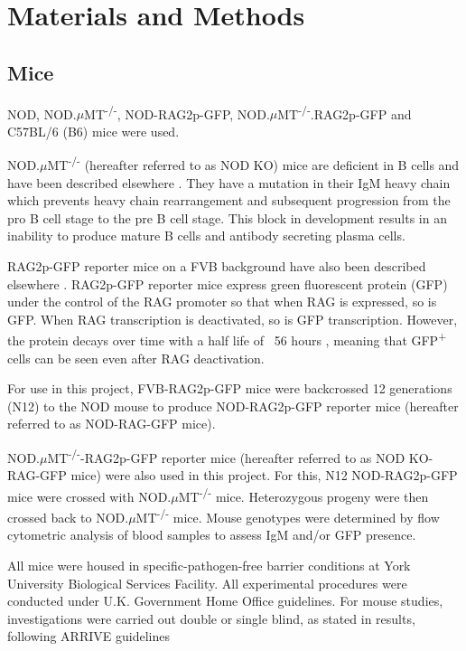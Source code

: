
\chapter{Materials and Methods}



\section{Mice}
\label{methods:mice}

NOD, NOD.$\mu$MT\textsuperscript{-/-}, NOD-RAG2p-GFP, NOD.$\mu$MT\textsuperscript{-/-}.RAG2p-GFP and C57BL/6 (B6) mice were used.

NOD.$\mu$MT\textsuperscript{-/-} (hereafter referred to as NOD KO) mice are deficient in B cells and have been described elsewhere \citep{Serreze1996}.
They have a mutation in their IgM heavy chain which prevents heavy chain rearrangement and subsequent progression from the pro B cell stage to the pre B cell stage.
This block in development results in an inability to produce mature B cells and antibody secreting plasma cells.

RAG2p-GFP reporter mice on a FVB background have also been described elsewhere \citep{Yu1999}.
RAG2p-GFP reporter mice express green fluorescent protein (GFP) under the control of the RAG promoter so that when RAG is expressed, so is GFP.
When RAG transcription is deactivated, so is GFP transcription.
However, the protein decays over time with a half life of ~56 hours \citep{McCaughtry2007}, meaning that GFP\textsuperscript{+} cells can be seen even after RAG deactivation.

For use in this project, FVB-RAG2p-GFP mice were backcrossed 12 generations (N12) to the NOD mouse to produce NOD-RAG2p-GFP reporter mice (hereafter referred to as NOD-RAG-GFP mice).

NOD.$\mu$MT\textsuperscript{-/-}-RAG2p-GFP reporter mice (hereafter referred to as NOD KO-RAG-GFP mice) were also used in this project.
For this, N12 NOD-RAG2p-GFP mice were crossed with NOD.$\mu$MT\textsuperscript{-/-} mice.
Heterozygous progeny were then crossed back to NOD.$\mu$MT\textsuperscript{-/-} mice.
Mouse genotypes were determined by flow cytometric analysis of blood samples to assess IgM and/or GFP presence.

All mice were housed in specific-pathogen-free barrier conditions at York University Biological Services Facility. 
All experimental procedures were conducted under U.K. Government Home Office guidelines.
For mouse studies, investigations were carried out double or single blind, as stated in results, following ARRIVE guidelines \citep{Arriveguidelines}





